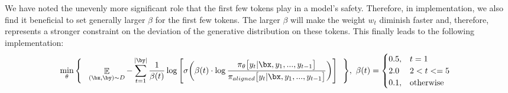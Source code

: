 We have noted the unevenly more significant role that the first few tokens play in a model's safety. Therefore, in implementation, we also find it beneficial to set generally larger $\beta$ for the first few tokens. The larger $\beta$ will make the weight $w_t$ diminish faster and, therefore, represents a stronger constraint on the deviation of the generative distribution on these tokens. This finally leads to the following implementation: 
\begin{align}
    \label{eqn:soft-sft-biased}
    & \min_{\theta} \Bigg\{ \ \ \mathop{\mathbb E}_{(\bx,\by)\sim D} -  \sum_{t=1}^{|\by|} \frac{1}{\beta(t)} \log\Bigg[\sigma \bigg( \beta(t) \cdot  \log \frac{\pi_{\theta}\big[y_t|\bx, y_1,...,y_{t-1}\big]}{\pi_{aligned}\big[y_t|\bx, y_1,...,y_{t-1}\big]}  \bigg)  \Bigg] \ \ \Bigg\}, \ \beta(t) = 
    \begin{cases} 0.5 , & t =1 \\
        2.0 & 2 < t <= 5 \\
        0.1 , & \text{otherwise}
    \end{cases}
\end{align}





